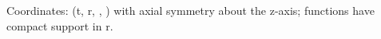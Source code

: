\documentclass{article}
\begin{document}
Coordinates: (t, r, \theta, \phi) with axial symmetry about the z-axis; functions have compact support in r.
\end{document}
